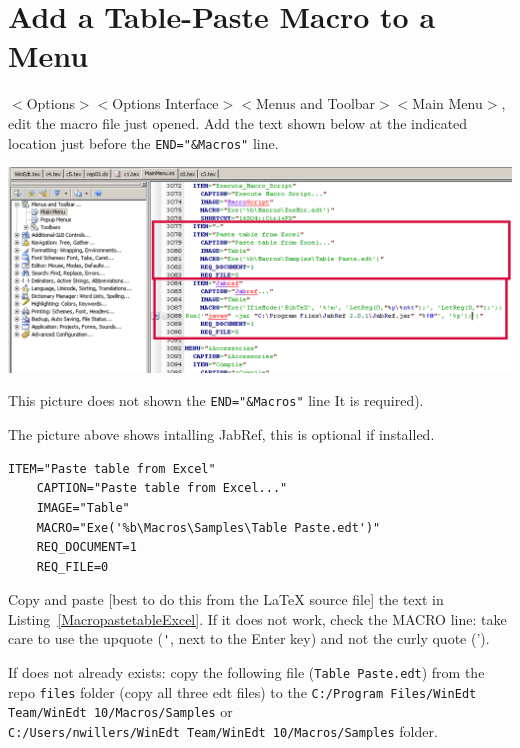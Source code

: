 \section{Add a Table-Paste Macro to a Menu}
\label{sec:addpastetable}

$<$Options$>$$<$Options Interface$>$$<$Menus and Toolbar$>$$<$Main Menu$>$, edit the macro file just opened. Add the text shown below at the indicated location just before the \lstinline{END="&Macros"} line.


\centerline{\includegraphics[bb= 0 0 1055 431,width=\textwidth]{eps/AddExcelTable.png}}

This picture does not shown the \lstinline{END="&Macros"} line It is required).

The picture above shows intalling JabRef, this is optional if installed.

\begin{lstlisting}[label=MacropastetableExcel,caption=Macro to paste table from Excel]
    ITEM="Paste table from Excel"
    CAPTION="Paste table from Excel..."
    IMAGE="Table"
    MACRO="Exe('%b\Macros\Samples\Table Paste.edt')"
    REQ_DOCUMENT=1
    REQ_FILE=0
\end{lstlisting}

Copy and paste [best to do this from the LaTeX source file] the text in Listing~\ref{MacropastetableExcel}. If it does not work,  check the MACRO line:  take care to use the upquote (\verb+'+,  next to the Enter key) and not the curly quote (').

If does not already exists: copy the following file (\lstinline{Table Paste.edt}) from the repo \lstinline{files} folder  (copy all three edt files)
 to the
\lstinline{C:/Program Files/WinEdt Team/WinEdt 10/Macros/Samples} or\\
\lstinline{C:/Users/nwillers/WinEdt Team/WinEdt 10/Macros/Samples}
folder.

